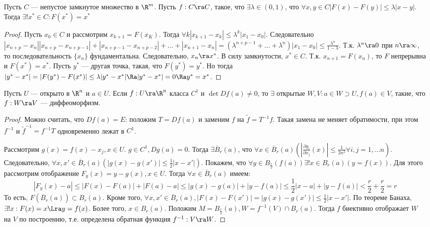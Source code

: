 \begin{theorem}[Банах]
    Пусть \(C\) --- непустое замкнутое множество в \(\R^m\). Пусть \(f: C \ra C\), такое, что \(\exists \lambda \in (0, 1)\), что \(\forall x, y \in C |F(x) - F(y)| \le \lambda|x - y|\). Тогда \(\exists! x^* \in C: F(x^*) = x^*\)
\end{theorem}
\begin{proof}
    Пусть \(x_0 \in C\) и рассмотрим \(x_{k + 1} = F(x_K)\). Тогда \(\forall k |x_{k + 1} - x_k| \le \lambda^k |x_1 - x_0|\). Следовательно \(|x_{n + p} - x_n| |x_{n + p} - x_{n + p - 1}| + |x_{n + p - 1} - x_{n + p - 2}| + \dots + |x_{n + 1} - x_n| = \left(\lambda^{n + p - 1} + \dots + \lambda^n\right)|x_1 - x_0| \le \frac{\lambda^n}{1 - \lambda}\). Т.к. \(\lambda^n \ra 0\) при \(n \ra \infty\), то последовательность \(\{x_n\}\) фундаментальна. Следовательно, \(x_n \ra x^*\). В силу замкнутости, \(x^* \in C\). Т.к. \(x_{n + 1} = F(x_n)\), то \(F\) непрерывна и \(F(x^*) = x^*\). Пусть \(y^*\) --- другая точка, такая, что \(F(y^*) = y^*\). Но тогда \(|y^* - x^*| = |F(y^*) - F(x^*)| \le \lambda |y^* - x^*| \Ra |y^* - x^*| = 0 \Ra y^* = x^*\).
\end{proof}

\begin{theorem}
    Пусть \(U\) --- открыто в \(\R^n\) и \(a \in U\). Если \(f: U \ra \R^n\) класса \(C^1\) и \(\det Df(a) \ne 0\), то \(\exists\) открытые \(W, V: a \in W \supset U, f(a) \in V\), такие, что \(f: W \ra V\) --- диффеоморфизм.
\end{theorem}
\begin{proof}
    Можно считать, что \(Df(a) = E\): положим \(T = Df(a)\) и заменим \(f\) на \(\tilde{f} = T^{-1}f\). Такая замена не меняет обратимости, при этом \(f^{-1}\) и \(\tilde{f}^{-1} = f^{-1}T\) одновременно лежат в \(C^1\).

    Рассмотрим \(g(x) = f(x) - x_j, x \in U\). \(g \in C^1, Dg(a) = 0\). Тогда \(\exists \overline{B}_r(a)\), что \(\forall x \in \overline{B}_r(a) \left(\left| \frac{\partial g_i}{\partial x_j}(x) \right| \le \frac{1}{2n^2} \forall i, j = 1, \dots n\right)\). Следовательно, \(\forall x, x' \in \overline{B}_r(a) (|g(x) - g(x')| \le \frac{1}{2}|x - x'|)\). Покажем, что \(\forall y \in B_{\frac{r}{2}}(f(a)) \exists !x \in B_r(a) (y = f(x))\). Для этого рассмотрим отображение \(F_y(x) = y - g(x), x \in U\). Тогда \(\forall x \in \overline{B}_r(a)\) имеем: 
    \[|F_y(x) - a| \le |F(x) - F(a)| + |F(a) - a| \le |g(x) - g(a)| + |y - f(a)| \le \frac{1}{2}|x - a| + |y - f(a)| < \frac{r}{2} + \frac{r}{2} = r\]
    То есть, \(F(\overline{B}_r(a)) \subset B_r(a)\). Кроме того, \(\forall x, x' \in \overline{B}_r(a), |F(x) - F(x')| = |g(x) - g(x')| \le \frac{1}{2}|x - x'|\). По теореме Банаха, \(\exists! x: F(x) = x \Lra y = f(x)\). Более того, \(x \in B_r(a)\). Положим \(M = B_{\frac{r}{2}}(a), W = f^{-1}(V) \cap B_r(a)\). Тогда \(f\) биективно отображает \(W\) на \(V\) по построению, т.е. определена обратная функция \(f^{-1}: V \ra W\).
\end{proof}
